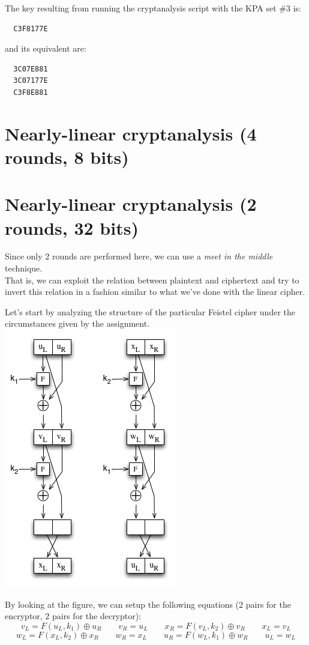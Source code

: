 \documentclass[a4paper,12pt,titlepage]{article}
\begin{document}
The key resulting from running the cryptanalysis script with the KPA set \#3 is:
\begin{verbatim}
  C3F8177E
\end{verbatim}

and its equivalent are:
\begin{verbatim}
  3C07E881
  3C07177E
  C3F8E881
\end{verbatim}

\section{Nearly-linear cryptanalysis (4 rounds, 8 bits)}
\section{Nearly-linear cryptanalysis (2 rounds, 32 bits)}
Since only 2 rounds are performed here, we can use a \emph{meet in the middle}
technique. \\
That is, we can exploit the relation between plaintext and ciphertext and try
to invert this relation in a fashion similar to what we've done with the linear
cipher.

Let's start by analyzing the structure of the particular Feistel cipher under
the circumstances given by the assignment. \\

\includegraphics{2_rounds_feistel.jpg}

By looking at the figure, we can setup the following equations (2 pairs for the
encryptor, 2 pairs for the decryptor):
\[v_L = F(u_L, k_1) \oplus u_R \qquad v_R = u_L \qquad x_R = F(v_L, k_2) \oplus v_R \qquad x_L = v_L\]
\[w_L = F(x_L, k_2) \oplus x_R \qquad w_R = x_L \qquad u_R = F(w_L, k_1) \oplus w_R \qquad u_L = w_L\]
\end{document}

